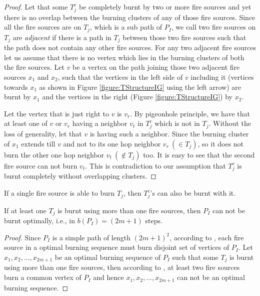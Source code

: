 \begin{proof}
Let that some $T^c_j$ be completely burnt by two or more fire sources and yet there is no overlap between the burning clusters of any of those fire sources.
Since all the fire sources are on $T_j$, which is a sub path of $P_I$, we call two fire sources on $T_j$ are \textit{adjacent} if there is a path in $T_j$ between those two fire sources such that the path does not contain any other fire sources.
For any two adjacent fire sources let us assume that there is no vertex which lies in the burning clusters of both the fire sources. Let $v$ be a vertex on the path joining those two adjacent fire sources $x_1$ and $x_2$, such that the vertices in the left side of $v$ including it (vertices towards $x_1$ as shown in Figure \ref{figure:TStructureIG} using the left arrow) are burnt by $x_1$ and the vertices in the right (Figure \ref{figure:TStructureIG}) by $x_2$.

Let the vertex that is just right to $v$ is $v_r$. By pigeonhole principle, we have that at least one of $v$ or $v_r$ having a neighbor $v_t$ in $T^c_j$ which is not in $T_j$. Without the loss of generality, let that $v$ is having such a neighbor. Since the burning cluster of $x_1$ extends till $v$ and not to its one hop neighbor $v_r\ (\in T_j)$, so it does not burn the other one hop neighbor $v_t\ (\not\in T_j)$ too. It is easy to see that the second fire source can not burn  $v_t$. This is contradiction to our assumption that $T^c_j$ is burnt completely without overlapping clusters.
\end{proof}

\begin{corollary}\label{corollary:Tone}
    If a single fire source is able to burn $T_j$, then $T^c_j$'s can also be burnt with it.
\end{corollary}

\begin{lemma}\label{lemma:notopt}
If at least one $T_j$ is burnt using more than one fire sources, then $P_I$ can not be burnt optimally, i.e., in $b(P_I)= (2m+1)$ steps.
\end{lemma}
\begin{proof}
Since $P_I$ is a simple path of length $(2m+1)^2$, according to , each fire source in a optimal burning sequence must burn disjoint set of vertices of $P_I$. Let ${x_1, x_2,...,x_{2m+1}}$ be an optimal burning sequence of $P_I$ such that some $T_j$ is burnt using more than one fire sources, then according to , at least two fire sources burn a common vertex of $P_I$ and hence ${x_1, x_2,...,x_{2m+1}}$ can not be an optimal burning sequence.
\end{proof}

